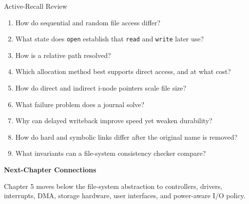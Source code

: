 \documentclass[10pt,letterpaper]{article}
\begin{document}
\enlargethispage{2\baselineskip}
\begin{studybox}{Active-Recall Review}
\small
\begin{enumerate}
  \item How do sequential and random file access differ?
  \item What state does \texttt{open} establish that \texttt{read} and \texttt{write} later use?
  \item How is a relative path resolved?
  \item Which allocation method best supports direct access, and at what cost?
  \item How do direct and indirect i-node pointers scale file size?
  \item What failure problem does a journal solve?
  \item Why can delayed writeback improve speed yet weaken durability?
  \item How do hard and symbolic links differ after the original name is removed?
  \item What invariants can a file-system consistency checker compare?
\end{enumerate}
\end{studybox}

\par\medskip
{\color{navy}\bfseries Next-Chapter Connections}\par\smallskip
Chapter 5 moves below the file-system abstraction to controllers, drivers, interrupts, DMA, storage hardware, user interfaces, and power-aware I/O policy.
\normalsize
\end{document}
